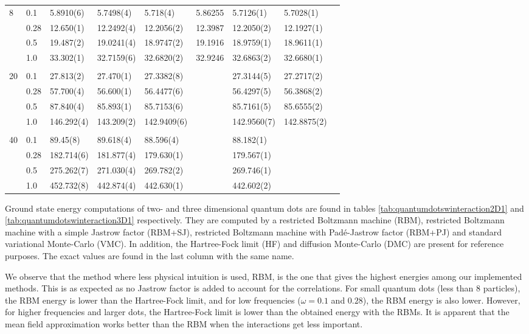 {\begin{landscape}
\begin{table}
\begin{tabularx}{\hsize}{llR{2.65cm}R{2.65cm}R{2.65cm}R{2.65cm}R{2.65cm}R{2.65cm}R{2.65cm}}
				8 & 0.1 & 5.8910(6) & 5.7498(4) & 5.718(4) & 5.86255 & 5.7126(1) & 5.7028(1) \\ 
				& 0.28 & 12.650(1) & 12.2492(4) & 12.2056(2) & 12.3987 & 12.2050(2) & 12.1927(1) \\
				& 0.5 & 19.487(2) & 19.0241(4) & 18.9747(2) & 19.1916 & 18.9759(1) & 18.9611(1) \\
				& 1.0 & 33.302(1) & 32.7159(6) & 32.6820(2) & 32.9246 & 32.6863(2) & 32.6680(1) \\ \hdashline \\
				
				20 & 0.1 & 27.813(2) & 27.470(1) & 27.3382(8) & & 27.3144(5) & 27.2717(2) \\ 
				& 0.28 & 57.700(4) & 56.600(1) & 56.4477(6) & & 56.4297(5) & 56.3868(2) \\
				& 0.5 & 87.840(4) & 85.893(1) & 85.7153(6) & & 85.7161(5) & 85.6555(2) \\
				& 1.0 & 146.292(4) & 143.209(2) & 142.9409(6) & & 142.9560(7) & 142.8875(2) \\ \hdashline \\
				
				40 & 0.1 & 89.45(8) & 89.618(4) & 88.596(4) & & 88.182(1) \\ 
				& 0.28 & 182.714(6) & 181.877(4) & 179.630(1) & & 179.567(1) \\
				& 0.5 & 275.262(7) & 271.030(4) & 269.782(2) & & 269.746(1) \\
				& 1.0 & 452.732(8) & 442.874(4) & 442.630(1) & & 442.602(2) \\ \hline\hline
			\end{tabularx}
		\end{table}
	\end{landscape}
}

Ground state energy computations of two- and three dimensional quantum dots are found in tables \eqref{tab:quantumdotswinteraction2D1} and \eqref{tab:quantumdotswinteraction3D1} respectively. They are computed by a restricted Boltzmann machine (RBM), restricted Boltzmann machine with a simple Jastrow factor (RBM+SJ), restricted Boltzmann machine with Padé-Jastrow factor (RBM+PJ) and standard variational Monte-Carlo (VMC). In addition, the Hartree-Fock limit (HF) and diffusion Monte-Carlo (DMC) are present for reference purposes. The exact values are found in the last column with the same name. 

We observe that the method where less physical intuition is used, RBM, is the one that gives the highest energies among our implemented methods. This is as expected as no Jastrow factor is added to account for the correlations. For small quantum dots (less than 8 particles), the RBM energy is lower than the Hartree-Fock limit, and for low frequencies ($\omega=0.1$ and $0.28$), the RBM energy is also lower. However, for higher frequencies and larger dots, the Hartree-Fock limit is lower than the obtained energy with the RBMs. It is apparent that the mean field approximation works better than the RBM when the interactions get less important. 

